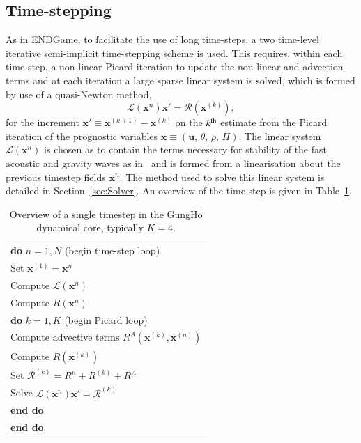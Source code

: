 \documentclass[times]{elsarticle}
\providecommand{\tabularnewline}{\\}
\begin{document}
\subsection{Time-stepping\label{sec:sub:timestepping}}
As in ENDGame, to facilitate the use of long time-steps, a two time-level 
iterative semi-implicit time-stepping scheme is used. This requires, within each 
time-step, a non-linear Picard iteration to update the non-linear and advection terms 
and at each iteration a large sparse linear system is solved, which is formed by 
use of a quasi-Newton method,
%
\begin{equation}
\mathcal{L}\left(\mathbf{x}^n\right)\mathbf{x}' = \mathcal{R}\left(\mathbf{x}^{(k)}\right),\label{eq:quasi-newton}
\end{equation}
%
for the increment $\mathbf{x}'\equiv\mathbf{x}^{(k+1)}-\mathbf{x}^{(k)}$ on the $k^{\rm{th}}$ 
estimate from the Picard iteration of the prognostic variables $\mathbf{x}\equiv\left(\mathbf{u},\,\theta,\,\rho,\,\Pi\right)$. 
The linear system $\mathcal{L}\left(\mathbf{x}^n\right)$ is chosen as to contain the terms necessary for stability of 
the fast acoustic and gravity waves as in~\cite{QJ:QJ2235} and is formed from a linearisation about the previous 
timestep fields $\mathbf{x}^n$. The method used to solve this linear system is detailed in Section~\ref{sec:Solver}. 
An overview of the time-step is given in Table~\ref{tab:timestep}.
%
\begin{table}
\begin{centering}
\begin{tabular}{l}
\hline 
\textbf{do} $n=1,N$ (begin time-step loop)\tabularnewline
\hspace{0.5cm}Set $\mathbf{x}^{(1)} = \mathbf{x}^n$\tabularnewline
\hspace{0.5cm}Compute $\mathcal{L}\left(\mathbf{x}^n\right)$\tabularnewline
\hspace{0.5cm}Compute $R\left(\mathbf{x}^n\right)$\tabularnewline
\hspace{0.5cm}\textbf{do} $k=1,K$ (begin Picard loop)\tabularnewline
\hspace{1.0cm}Compute advective terms $R^A\left(\mathbf{x}^{(k)},\mathbf{x}^{(n)}\right)$\tabularnewline
\hspace{1.0cm}Compute $R\left(\mathbf{x}^(k)\right)$\tabularnewline
\hspace{1.0cm}Set $\mathcal{R}^{(k)} = R^n + R^{(k)} + R^A$\tabularnewline

\hspace{1.0cm}Solve $\mathcal{L}\left(\mathbf{x}^n\right)\mathbf{x}' = \mathcal{R}^{(k)}$\tabularnewline
\hspace{0.5cm}\textbf{end do}\tabularnewline
\textbf{end do}\tabularnewline
\hline
\end{tabular}
\end{centering}
\caption{\label{tab:timestep}Overview of a single timestep in the GungHo dynamical core, typically $K=4$.}
\end{table}
%
\end{document}
